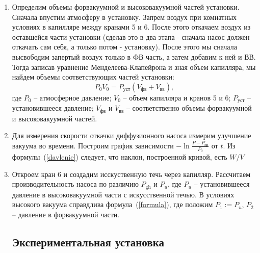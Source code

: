 \documentclass[12pt,a4paper]{article}
\begin{document}
\begin{enumerate}
\item
	Определим объемы форвакуумной и высоковакуумной частей установки. Сначала впустим атмосферу в установку. Запрем воздух при комнатных условиях в капилляре между кранами 5 и 6. После этого откачаем воздух из оставшейся части установки (сделав это в два этапа - сначала насос должен откачать сам себя, а только потом - установку). После этого мы сначала высвободим запертый воздух только в ФВ часть, а затем добавим к ней и ВВ. Тогда записав уравнение Менделеева-Клапейрона и зная объем капилляра, мы найдем объемы соответствующих частей установки:
\begin{equation}
	P_0 V_0 = P_{\text{уст}} (V_{\text{фв}} + V_{\text{вв}}),
\end{equation}
где $P_0$ -- атмосферное давление; $V_0$ -- объем капилляра и кранов 5 и 6; $P_{\text{уст}}$ -- установившееся давление; $V_{\text{фв}}$ и $V_{\text{вв}}$ -- соответственно объемы форвакуумной и высоковакуумной частей.
	
\item
	Для измерения скорости откачки диффузионного насоса измерим улучшение вакуума во времени. Построим график зависимости $-\ln{\frac{P-P_{\text{пр}}}{P_0}}$ от $t$. Из формулы~(\ref{davlenie}) следует, что наклон, построенной кривой, есть $W / V$

\item
	Откроем кран 6 и создадим исскуственную течь через капилляр. Рассчитаем производительность насоса по различию $P_{\text{gh}}$ и $P_u$, где $P_u$ -- установившееся давление в высоковакуумной части с искусственной течью. В условиях высокого вакуума справдлива формула~(\ref{formula}), где положим $P_1 := P_u$, $P_2$ -- давление в форвакуумной части. 

\subsection{Экспериментальная установка}


\end{enumerate}
\end{document}
